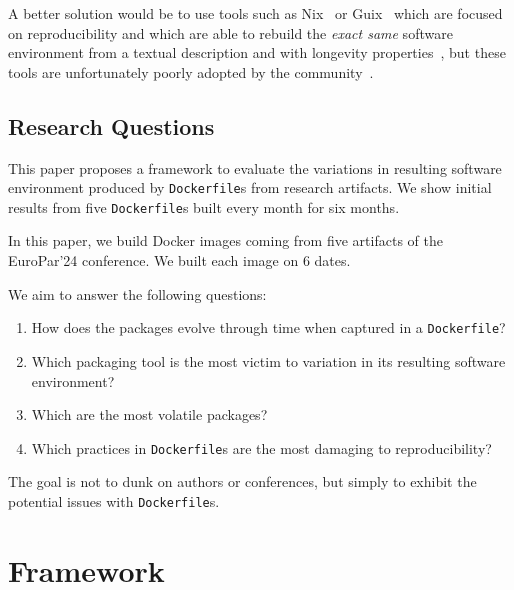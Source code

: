 \documentclass[sigconf,natbib=false]{acmart}
\newcommand{\df}{\texttt{Dockerfile}}
\begin{document}
A better solution would be to use tools such as Nix~\cite{dolstra_nix_2004} or Guix~\cite{courtes_functional_2013} which are focused on reproducibility and which are able to rebuild the \emph{exact same} software environment from a textual description and with longevity properties~\cite{courtes2024source}, but these tools are unfortunately poorly adopted by the community~\cite{guilloteau2024longevity}.

\subsection{Research Questions}


This paper proposes a framework to evaluate the variations in resulting software environment produced by \texttt{Dockerfile}s from research artifacts.
We show initial results from five \texttt{Dockerfile}s built every month for six months.

In this paper, we build Docker images coming from five artifacts of the EuroPar'24 conference.
We built each image on 6 dates.


We aim to answer the following questions:

\begin{enumerate}
\item How does the packages evolve through time when captured in a \texttt{Dockerfile}?
\item Which packaging tool is the most victim to variation in its resulting software environment?
\item Which are the most volatile packages?
\item Which practices in \df s are the most damaging to reproducibility?
\end{enumerate}


The goal is not to dunk on authors or conferences, but simply to exhibit the potential issues with \texttt{Dockerfile}s.

\section{Framework}

\end{document}
